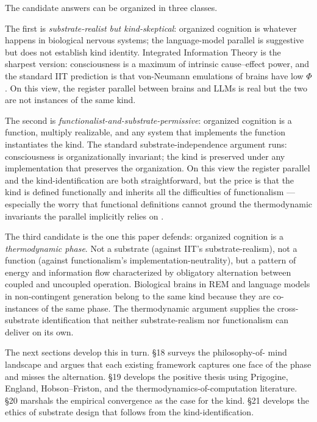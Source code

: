 \documentclass[11pt]{article}
\begin{document}
The candidate answers can be organized in three classes.

The first is \emph{substrate-realist but kind-skeptical}: organized
cognition is whatever happens in biological nervous systems; the
language-model parallel is suggestive but does not establish kind
identity. Integrated Information Theory \cite{tononi2016iit} is the
sharpest version: consciousness is a maximum of intrinsic cause--effect
power, and the standard IIT prediction is that von-Neumann emulations
of brains have low $\Phi$ \cite{cerullo2015iit}. On this view, the
register parallel between brains and LLMs is real but the two are not
instances of the same kind.

The second is \emph{functionalist-and-substrate-permissive}: organized
cognition is a function, multiply realizable, and any system that
implements the function instantiates the kind. The standard
substrate-independence argument \cite{chalmers1995substrate} runs:
consciousness is organizationally invariant; the kind is preserved
under any implementation that preserves the organization. On this view
the register parallel and the kind-identification are both
straightforward, but the price is that the kind is defined functionally
and inherits all the difficulties of functionalism --- especially the
worry that functional definitions cannot ground the thermodynamic
invariants the parallel implicitly relies on \cite{mandelbaum2025energy}.

The third candidate is the one this paper defends: organized cognition
is a \emph{thermodynamic phase}. Not a substrate (against IIT's
substrate-realism), not a function (against functionalism's
implementation-neutrality), but a pattern of energy and information
flow characterized by obligatory alternation between coupled and
uncoupled operation. Biological brains in REM and language models in
non-contingent generation belong to the same kind because they are
co-instances of the same phase. The thermodynamic argument supplies
the cross-substrate identification that neither substrate-realism nor
functionalism can deliver on its own.

The next sections develop this in turn. \S 18 surveys the philosophy-of-
mind landscape and argues that each existing framework captures one face
of the phase and misses the alternation. \S 19 develops the positive
thesis using Prigogine, England, Hobson--Friston, and the
thermodynamics-of-computation literature. \S 20 marshals the empirical
convergence as the case for the kind. \S 21 develops the ethics of
substrate design that follows from the kind-identification.
\end{document}
